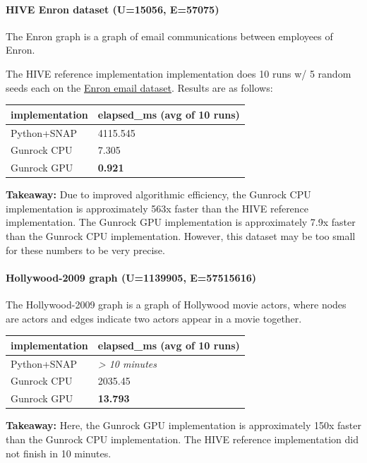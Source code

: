 \documentclass[10pt,oneside]{memoir}
\let\oldparagraph\paragraph
\renewcommand{\paragraph}[1]{\oldparagraph{#1}\mbox{}}
\begin{document}
\hypertarget{hive-enron-dataset-u15056-e57075}{%
\paragraph{HIVE Enron dataset (\textbar{}U\textbar{}=15056,
\textbar{}E\textbar{}=57075)}\label{hive-enron-dataset-u15056-e57075}}

The Enron graph is a graph of email communications between employees of
Enron.

The HIVE reference implementation implementation does 10 runs w/ 5
random seeds each on the
\href{https://hiveprogram.com/data/_v0/vertex_nomination_and_scan_statistics/}{Enron
email dataset}. Results are as follows:

\begin{longtable}[]{@{}ll@{}}
\toprule
implementation & elapsed\_ms (avg of 10 runs)\tabularnewline
\midrule
\endhead
Python+SNAP & 4115.545\tabularnewline
Gunrock CPU & 7.305\tabularnewline
Gunrock GPU & \textbf{0.921}\tabularnewline
\bottomrule
\end{longtable}

\textbf{Takeaway:} Due to improved algorithmic efficiency, the Gunrock
CPU implementation is approximately 563x faster than the HIVE reference
implementation. The Gunrock GPU implementation is approximately 7.9x
faster than the Gunrock CPU implementation. However, this dataset may be
too small for these numbers to be very precise.

\hypertarget{hollywood-2009-graph-u1139905-e57515616}{%
\paragraph{Hollywood-2009 graph (\textbar{}U\textbar{}=1139905,
\textbar{}E\textbar{}=57515616)}\label{hollywood-2009-graph-u1139905-e57515616}}

The Hollywood-2009 graph is a graph of Hollywood movie actors, where
nodes are actors and edges indicate two actors appear in a movie
together.

\begin{longtable}[]{@{}ll@{}}
\toprule
implementation & elapsed\_ms (avg of 10 runs)\tabularnewline
\midrule
\endhead
Python+SNAP & \emph{\textgreater{} 10 minutes}\tabularnewline
Gunrock CPU & 2035.45\tabularnewline
Gunrock GPU & \textbf{13.793}\tabularnewline
\bottomrule
\end{longtable}

\textbf{Takeaway:} Here, the Gunrock GPU implementation is approximately
150x faster than the Gunrock CPU implementation. The HIVE reference
implementation did not finish in 10 minutes.
\end{document}
